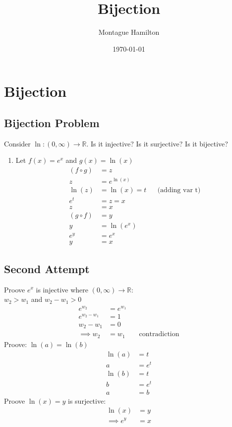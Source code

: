 \documentclass{article}
\begin{document}
\title{Bijection}
\author{Montague Hamilton}
\date{\today}
\maketitle

\section{Bijection}
\subsection{Bijection Problem}
Consider $\ln : (0,\infty) \to \mathbb{R}$. Is it injective? Is it surjective? Is it bijective?
\begin{enumerate}
  \item Let $f(x) = e^{x}$ and $g(x) = \ln(x)$
    \begin{align*}
      (f \circ g) &= z \\
      z       &= e^{\ln(x)} \\
      \ln(z)  &= \ln(x) = t && \text{(adding var t)} \\
      e^{t}      &= z = x \\
      z       &= x \\
      (g \circ f) &= y \\
      y       &= \ln(e^{x}) \\
      e^{y}      &= e^{x} \\
      y       &= x
    \end{align*}
\end{enumerate}

\newpage
\subsection{Second Attempt}
Proove $e^{x}$ is injective where $(0, \infty) \to \mathbb{R}$: \\
$w_{2}>w_{1}$ and $w_{2}-w_{1} > 0$
\begin{align*}
  e^{w_{2}} &= e^{w_{1}} \\
  e^{w_{2}-w_{1}} &= 1 \\
  w_{2} - w_{1} &= 0 \\
  \implies w_{2} &= w_{1} \qquad \text{contradiction}
\end{align*} 
Proove: $\ln(a) = \ln(b)$
\begin{align*}
  \ln(a) &= t \\
  a      &= e^{t} \\
  \ln(b) &= t \\
  b      &= e^{t} \\
  a      &= b
\end{align*}
Proove $\ln(x) = y$ is surjective:
\begin{align*}
  \ln(x) &= y \\
  \implies e^{y} &= x \\
\end{align*}
\end{document}
